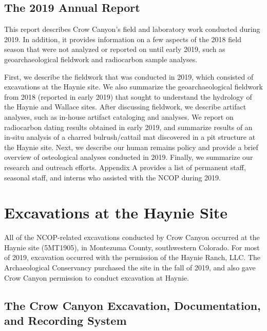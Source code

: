 \documentclass[
  12pt,
]{krantz}
\begin{document}
\hypertarget{the-2019-annual-report}{%
\section{The 2019 Annual Report}\label{the-2019-annual-report}}

This report describes Crow Canyon's field and laboratory work conducted
during 2019. In addition, it provides information on a few aspects of
the 2018 field season that were not analyzed or reported on until early
2019, such as geoarchaeological fieldwork and radiocarbon sample
analyses.

First, we describe the fieldwork that was conducted in 2019, which
consisted of excavations at the Haynie site. We also summarize the
geoarchaeological fieldwork from 2018 (reported in early 2019) that
sought to understand the hydrology of the Haynie and Wallace sites.
After discussing fieldwork, we describe artifact analyses, such as
in-house artifact cataloging and analyses. We report on radiocarbon
dating results obtained in early 2019, and summarize results of an
in-situ analysis of a charred bulrush/cattail mat discovered in a pit
structure at the Haynie site. Next, we describe our human remains policy
and provide a brief overview of osteological analyses conducted in 2019.
Finally, we summarize our research and outreach efforts. Appendix A
provides a list of permanent staff, seasonal staff, and interns who
assisted with the NCOP during 2019.

\hypertarget{excavations-at-the-haynie-site}{%
\chapter{Excavations at the Haynie Site}\label{excavations-at-the-haynie-site}}

All of the NCOP-related excavations conducted by Crow Canyon occurred at
the Haynie site (5MT1905), in Montezuma County, southwestern Colorado.
For most of 2019, excavation occurred with the permission of the Haynie
Ranch, LLC. The Archaeological Conservancy purchased the site in the
fall of 2019, and also gave Crow Canyon permission to conduct excavation
at Haynie.

\hypertarget{the-crow-canyon-excavation-documentation-and-recording-system}{%
\section{The Crow Canyon Excavation, Documentation, and Recording System}\label{the-crow-canyon-excavation-documentation-and-recording-system}}
\end{document}
